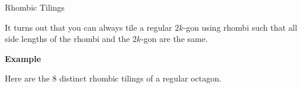 \documentclass[10pt, compress,aspectratio=169,handout]{beamer}
\begin{document}

\begin{frame}{Rhombic Tilings}\pause

\vspace{1em}

It turns out that you can always tile a regular $2k$-gon using rhombi such that all side lengths of the rhombi and the $2k$-gon are the same.

\pause

\begin{block}{\textbf{Example}}

\vspace{-.5em}

Here are the 8 distinct rhombic tilings of a regular octagon.

\vspace{-1em}


\end{block}
\end{frame}
\end{document}
